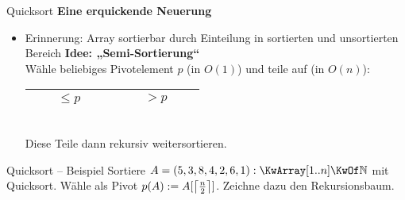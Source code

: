 



	

\iffalse

\begin{frame}{Zum letzten Übungsblatt}
	\textbf{Achtung bei der Wahl von Datenstrukturen} \\[0,125cm]
	\begin{itemize}
		\pause
		\item Aufgabenstellung spezifiziert nicht, ob eine Menge von Daten als Array oder Liste gegeben ist \impl Beides darf als Parametertyp gewählt werden
		\pause
		\item Aber: Wenn über die Daten iteriert wird, folgendes beachten:
		\pause
		\item Listen bieten Indexzugriff i.A. \textbf{nicht in konstanter Zeit}! D.h. wenn man „via Index“ über eine Liste iteriert, hat die Iteration eine Laufzeit von $\Theta(n^2)$
		\pause
		\item Daher: Iteration bei Arrays frei via Index oder \textit{for-each}, bei Listen \textbf{nur} \textit{for-each}, wenn die Laufzeit wichtig ist (bei Arrays und Listen kann davon ausgegangen werden, dass \textit{for-each} die Daten in linearer Reihenfolge durchläuft)
	\end{itemize}
\end{frame}

\fi

\begin{frame}{Quicksort}
	\textbf{Eine erquickende Neuerung} \\[0,125cm]
	\begin{itemize}
		\item Erinnerung: Array sortierbar durch Einteilung in sortierten und unsortierten Bereich
		\pause
		\implitem \textbf{Idee: „Semi-Sortierung“} \\
		Wähle beliebiges Pivotelement $p$ (in $O(1)$) und teile auf (in $O(n)$):
		\begin{tabular}{|c|c|}
			\hline
			$\qquad \leq p \qquad$  & $\qquad > p \qquad$  \\
			\hline
		\end{tabular} \\
		\forcenewline
		Diese Teile dann rekursiv weitersortieren.
	\end{itemize}
\end{frame}

\begin{frame}{Quicksort – Beispiel}
	Sortiere $A = (5,3,8,4,2,6,1): \KwArray[1..n] \KwOf \N$ mit Quicksort. Wähle als Pivot $p(A) := A[\ceil{\fract n/2 }]$. Zeichne dazu den Rekursionsbaum.
	\visible<2->{
		\begin{center}
			\texttt{[image: qstree]}
		\end{center}	
	}
\end{frame}

